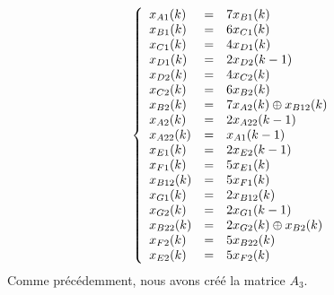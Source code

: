 \begin{equation}
\label{equ:ee2}
\left\lbrace
\begin{array}{l c l}
x_{A1}(k) &=&	7x_{B1}(k)\\ 
x_{B1}(k) &=&	6x_{C1}(k)\\
x_{C1}(k) &=& 	4x_{D1}(k)\\
x_{D1}(k) &=&	2x_{D2}(k-1)\\
x_{D2}(k) &=&	4x_{C2}(k)\\
x_{C2}(k) &=&	6x_{B2}(k)\\
x_{B2}(k) &=&	7x_{A2}(k) \oplus x_{B12}(k)\\
x_{A2}(k) &=&	2x_{A22}(k-1)\\
x_{A22}(k) &=&	x_{A1}(k-1)\\
x_{E1}(k) &=&	2x_{E2}(k-1)\\
x_{F1}(k) &=&	5x_{E1}(k)\\
x_{B12}(k) &=&	5x_{F1}(k)\\
x_{G1}(k) &=&	2x_{B12}(k)\\
x_{G2}(k) &=&	2x_{G1}(k-1)\\
x_{B22}(k) &=&	2x_{G2}(k) \oplus x_{B2}(k)\\
x_{F2}(k) &=&	5x_{B22}(k)\\
x_{E2}(k) &=&	5x_{F2}(k)   \\  
\end{array}
\right. 
\end{equation}
Comme précédemment, nous avons créé la matrice $A_3$.
